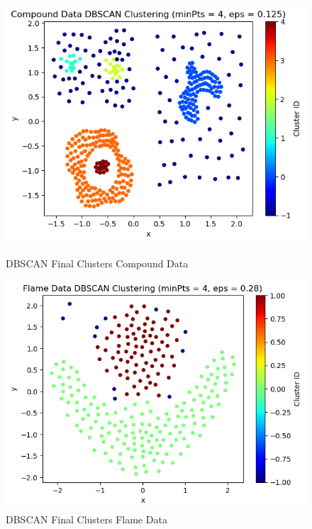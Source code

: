 \documentclass{article}
\begin{document}
\begin{figure}[H]
    \centering
    \begin{minipage}[b]{0.49\textwidth}
        \centering
        \includegraphics[width=\textwidth]{DB_final_compund.png}
        \caption{DBSCAN Final Clusters Compound Data}
    \end{minipage}
    \hfill
    \begin{minipage}[b]{0.49\textwidth}
        \centering
        \includegraphics[width=\textwidth]{DB_final_flame.png}
        \caption{DBSCAN Final Clusters Flame Data}
    \end{minipage}
\end{figure}
\end{document}
